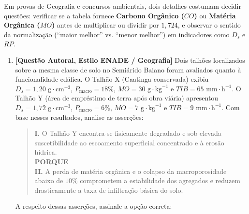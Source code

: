 
\begin{boxDica}
Em provas de Geografia e concursos ambientais, dois detalhes costumam decidir questões: verificar se a tabela fornece \textbf{Carbono Orgânico ($CO$)} ou \textbf{Matéria Orgânica ($MO$)} antes de multiplicar ou dividir por $1{,}724$, e observar o sentido da normalização (``maior melhor'' vs. ``menor melhor'') em indicadores como $D_s$ e $RP$.
\end{boxDica}

\begin{enumerate}[leftmargin=1.8em, itemsep=7pt]
  \item \textbf{[Questão Autoral, Estilo ENADE / Geografia]} Dois talhões localizados sobre a mesma classe de solo no Semiárido Baiano foram avaliados quanto à funcionalidade edáfica. O Talhão X (Caatinga conservada) exibiu $D_s = 1{,}20\text{ g}\cdot\text{cm}^{-3}$, $P_{\text{macro}} = 18\%$, $MO = 30\text{ g}\cdot\text{kg}^{-1}$ e $TIB = 65\text{ mm}\cdot\text{h}^{-1}$. O Talhão Y (área de empréstimo de terra após obra viária) apresentou $D_s = 1{,}72\text{ g}\cdot\text{cm}^{-3}$, $P_{\text{macro}} = 6\%$, $MO = 7\text{ g}\cdot\text{kg}^{-1}$ e $TIB = 9\text{ mm}\cdot\text{h}^{-1}$. Com base nesses resultados, analise as asserções:
  \begin{quote}
    \textbf{I.} O Talhão Y encontra-se fisicamente degradado e sob elevada suscetibilidade ao escoamento superficial concentrado e à erosão hídrica.\\
    \textbf{PORQUE}\\
    \textbf{II.} A perda de matéria orgânica e o colapso da macroporosidade abaixo de $10\%$ comprometem a estabilidade dos agregados e reduzem drasticamente a taxa de infiltração básica do solo.
  \end{quote}
  A respeito dessas asserções, assinale a opção correta:


\end{enumerate}
